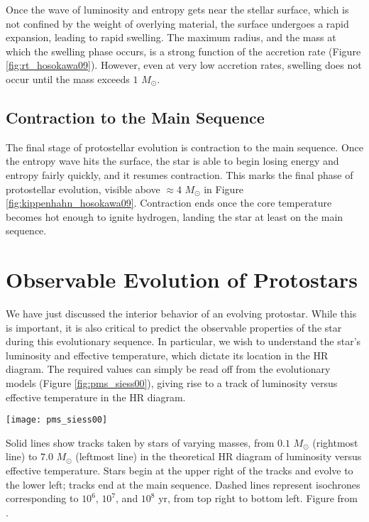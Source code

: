 Once the wave of luminosity and entropy gets near the stellar surface, which is not confined by the weight of overlying material, the surface undergoes a rapid expansion, leading to rapid swelling. The maximum radius, and the mass at which the swelling phase occurs, is a strong function of the accretion rate (Figure \ref{fig:rt_hosokawa09}). However, even at very low accretion rates, swelling does not occur until the mass exceeds $1$ $M_\odot$.

\subsection{Contraction to the Main Sequence}

The final stage of protostellar evolution is contraction to the main sequence. Once the entropy wave hits the surface, the star is able to begin losing energy and entropy fairly quickly, and it resumes contraction. This marks the final phase of protostellar evolution, visible above $\approx 4$ $M_\odot$ in Figure \ref{fig:kippenhahn_hosokawa09}. Contraction ends once the core temperature becomes hot enough to ignite hydrogen, landing the star at least on the main sequence.

\section{Observable Evolution of Protostars}


We have just discussed the interior behavior of an evolving protostar. While this is important, it is also critical to predict the observable properties of the star during this evolutionary sequence. In particular, we wish to understand the star's luminosity and effective temperature, which dictate its location in the HR diagram. The required values can simply be read off from the evolutionary models (Figure \ref{fig:pms_siess00}), giving rise to a track of luminosity versus effective temperature in the HR diagram.

\begin{marginfigure}
\texttt{[image: pms\_siess00]}
\caption[Pre-main sequence evolutionary tracks]{
\label{fig:pms_siess00}
Solid lines show tracks taken by stars of varying masses, from $0.1$ $M_\odot$ (rightmost line) to $7.0$ $M_\odot$ (leftmost line) in the theoretical HR diagram of luminosity versus effective temperature. Stars begin at the upper right of the tracks and evolve to the lower left; tracks end at the main sequence. Dashed lines represent isochrones corresponding to $10^6$, $10^7$, and $10^8$ yr, from top right to bottom left. Figure from \citet{siess00a}.
}
\end{marginfigure}


